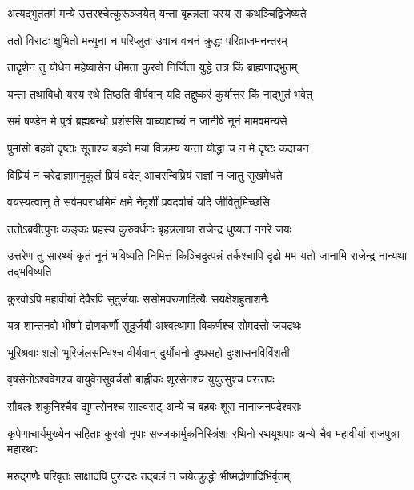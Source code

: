 \twolineshloka
{अत्यद्भुततमं मन्ये उत्तरश्चेत्कूरूञ्जयेत्}
{यन्ता बृहन्नला यस्य स कथञ्चिद्विजेष्यते}


\twolineshloka
{ततो विराटः क्षुभितो मन्युना च परिप्लुतः}
{उवाच वचनं क्रुद्धः परिव्राजमनन्तरम्}


\twolineshloka
{तादृशेन तु योधेन महेष्वासेन धीमता}
{कुरवो निर्जिता युद्धे तत्र किं ब्राह्मणाद्भुतम्}



\twolineshloka
{यन्ता तथाविधो यस्य रथे तिष्ठति वीर्यवान्}
{यदि तद्दुष्करं कुर्यात्तर किं नाद्भुतं भवेत्}



\twolineshloka
{समं षण्डेन मे पुत्रं ब्रह्मबन्धो प्रशंससि}
{वाच्यावाच्यं न जानीषे नूनं मामवमन्यसे}


\twolineshloka
{पुमांसो बहवो दृष्टाः सूताश्च बहवो मया}
{विक्रम्य यन्ता योद्धा च न मे दृष्टः कदाचन}


\twolineshloka
{विप्रियं न चरेद्राज्ञामनुकूलं प्रियं वदेत्}
{आचरन्विप्रियं राज्ञां न जातु सुखमेधते}


\twolineshloka
{वयस्यत्वात्तु ते सर्वमपराधमिमं क्षमे}
{नेदृशीं प्रवदर्वाचं यदि जीवितुमिच्छसि}



\twolineshloka
{ततोऽब्रवीत्पुनः कङ्कः प्रहस्य कुरुवर्धनः}
{बृहन्नलाया राजेन्द्र धुष्यतां नगरे जयः}


\threelineshloka
{उत्तरेण तु सारथ्यं कृतं नूनं भविष्यति}
{निमित्तं किञ्चिदुत्पन्नं तर्कश्चापि दृढो मम}
{यतो जानामि राजेन्द्र नान्यथा तद्भविष्यति}


\twolineshloka
{कुरवोऽपि महावीर्या देवैरपि सुदुर्जयाः}
{ससोमवरुणादित्यैः सयक्षेशहुताशनैः}


\twolineshloka
{यत्र शान्तनवो भीष्मो द्रोणकर्णौ सुदुर्जयौ}
{अश्वत्थामा विकर्णश्च सोमदत्तो जयद्रथः}


\twolineshloka
{भूरिश्रवाः शलो भूरिर्जलसन्धिश्च वीर्यवान्}
{दुर्योधनो दुष्प्रसहो दुःशासनविविंशती}


\twolineshloka
{वृषसेनोऽश्ववेगश्च वायुवेगसुवर्चसौ}
{बाह्लीकः शूरसेनश्च युयुत्सुश्च परन्तपः}


\twolineshloka
{सौबलः शकुनिश्चैव द्युमत्सेनश्च साल्वराट्}
{अन्ये च बहवः शूरा नानाजनपदेश्वराः}


\threelineshloka
{कृपेणाचार्यमुख्येन सहिताः कुरवो नृपाः}
{सज्जकार्मुकनिस्त्रिंशा रथिनो रथयूथपाः}
{अन्ये चैव महावीर्या राजपुत्रा महारथाः}


\twolineshloka
{मरुद्गणैः परिवृतः साक्षादपि पुरन्दरः}
{तद्बलं न जयेत्क्रुद्धो भीष्मद्रोणादिभिर्वृतम्}


